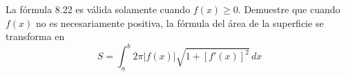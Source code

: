 \item La fórmula 8.22 es válida solamente cuando $f(x) \ge 0$. Demuestre que cuando $f(x)$ no es necesariamente positiva, la fórmula del área de la superficie se transforma en
    \[ S = \int_{a}^{b} 2\pi |f(x)| \sqrt{1 + [f'(x)]^2} \, dx \]
